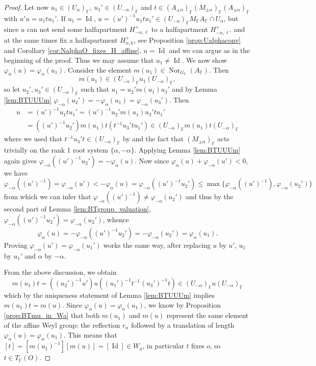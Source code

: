 \documentclass[12pt]{amsart}
\newcommand{\F}{\mathbb{F} }
\newcommand{\Id}{\operatorname{Id} }
\numberwithin{equation}{section}
\theoremstyle{remark} %
\begin{document}
\begin{proof}
			Let now $u_1 \in (U_\alpha)_\F,\ u_1' \in (U_{-\alpha})_\F$ and $ t \in (A_{\pm \alpha})_\F(M_{\pm \alpha})_\F (A_{\pm \alpha})_\F$ with $u'u = u_1 t u_1'$.
			If $u_1 = \Id$, $u=(u')^{-1} u_1 tu_1' \in (U_{-\alpha})_\F M_\F A_\F \cap U_{\alpha}$, but since $u$ can not send some halfapartment $H_{-\alpha,\ell}^+$ to a halfapartment $H_{-\alpha,\ell'}^+$ and at the same times fix a halfapartment $H_{\alpha,k}^+$, see Proposition \ref{prop:Ualphaconv} and Corollary \ref{cor:NalphaO_fixes_H_affine}, $u=\Id$ and we can argue as in the beginning of the proof. Thus we may assume that $u_1 \neq \operatorname{Id}$.			
			We now show $\varphi_\alpha(u)=\varphi_{\alpha}(u_1)$. Consider the element $m(u_1) \in \operatorname{Nor}_{G_\F}(A_\F)$. Then
			$$
			m(u_1) \in (U_{-\alpha})_\F u_1 (U_{-\alpha})_\F,
			$$
			so let $u_2', u_3' \in (U_{-\alpha})_\F$ such that $u_1 = u_2' m(u_1) u_3'$ and by Lemma \ref{lem:BTUUUm} $\varphi_{-\alpha}(u_2') = - \varphi_\alpha(u_1) = \varphi_{-\alpha}(u_3')$. Then
			\begin{align*}
				u&= (u')^{-1}u_1 t u_1' = (u')^{-1} u_2' m(u_1) u_3' t u_1' \\
				&= ((u')^{-1}u_2') m(u_1)t (t^{-1} u_3' t u_1') \in (U_{-\alpha})_\F m(u_1) t (U_{-\alpha})_\F 
			\end{align*}
			where we used that $t^{-1}u_3' t \in (U_{-\alpha})_\F$ by \cite[Proposition \ref{I-prop:anainN}]{AppAGRCF} and the fact that $(M_{\pm \alpha})_\F$ acts trivially on the rank 1 root system $\{\alpha, -\alpha\}$. Applying Lemma \ref{lem:BTUUUm} again gives $\varphi_{-\alpha}((u')^{-1}u_2') = - \varphi_\alpha(u) $. Now since $\varphi_\alpha(u) + \varphi_{-\alpha}(u') < 0$, we have 
			$$
			\varphi_{-\alpha}((u')^{-1}) = \varphi_{-\alpha}(u') < -\varphi_\alpha(u) = \varphi_{-\alpha}((u')^{-1}u_2') \leq \max\{ \varphi_{-\alpha}((u')^{-1}), \varphi_{-\alpha}(u_2') \}
			$$
			from which we can infer that $\varphi_{-\alpha}((u')^{-1}) \neq \varphi_{-\alpha}(u_2')$ and thus by the second part of Lemma \ref{lem:BTgroup_valuation}, $\varphi_{-\alpha}((u')^{-1}u_2') = \varphi_{-\alpha}(u_2')$, whence 
			$$
			\varphi_\alpha(u) = - \varphi_{-\alpha}((u')^{-1}u_2') =  -\varphi_{-\alpha}(u_2') = \varphi_\alpha (u_1).
			$$
			Proving $\varphi_{-\alpha}(u') = \varphi_{-\alpha}(u_1')$ works the same way, after replacing $u$ by $u'$, $u_1$ by $u_1'$ and $\alpha$ by $-\alpha$.
			
			From the above discussion, we obtain
			$$
			m(u_1)t = ((u_2')^{-1}u') u ((u_1')^{-1}t^{-1}(u_3')^{-1}t) \in (U_{-\alpha})_\F u (U_{-\alpha})_\F
			$$
			which by the uniqueness statement of Lemma \ref{lem:BTUUUm} implies $m(u_1)t = m(u)$. Since $\varphi_\alpha(u) = \varphi_\alpha(u_1)$, we know by Proposition \ref{prop:BTmu_in_Wa} that both $m(u_1)$ and $m(u)$ represent the same element of the affine Weyl group: the reflection $r_\alpha$ followed by a translation of length $\varphi_\alpha(u) = \varphi_\alpha(u_1)$. This means that $[t] = [m(u_1)^{-1}][m(u)] = [\operatorname{Id}] \in W_a$, in particular $t$ fixes $o$, so $t \in T_\F(O)$.
		\end{proof}
		
\end{document}
